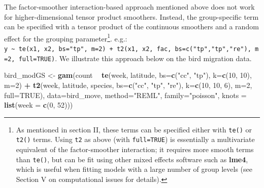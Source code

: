 \documentclass[12pt]{article}
\newenvironment{Shaded}{\begin{snugshade}}{\end{snugshade}}
\newcommand{\KeywordTok}[1]{\textcolor[rgb]{0.13,0.29,0.53}{\textbf{#1}}}
\newcommand{\DataTypeTok}[1]{\textcolor[rgb]{0.13,0.29,0.53}{#1}}
\newcommand{\DecValTok}[1]{\textcolor[rgb]{0.00,0.00,0.81}{#1}}
\newcommand{\StringTok}[1]{\textcolor[rgb]{0.31,0.60,0.02}{#1}}
\newcommand{\OtherTok}[1]{\textcolor[rgb]{0.56,0.35,0.01}{#1}}
\newcommand{\OperatorTok}[1]{\textcolor[rgb]{0.81,0.36,0.00}{\textbf{#1}}}
\newcommand{\NormalTok}[1]{#1}
\let\rmarkdownfootnote\footnote%
\def\footnote{\protect\rmarkdownfootnote}
\begin{document}
The factor-smoother interaction-based approach mentioned above does not
work for higher-dimensional tensor product smoothers. Instead, the
group-specific term can be specified with a tensor product of the
continuous smoothers and a random effect for the grouping
parameter\footnote{As mentioned in section II, these terms can be
  specified either with \texttt{te()} or \texttt{t2()} terms. Using
  \texttt{t2} as above (with \texttt{full=TRUE}) is essentially a
  multivariate equivalent of the factor-smoother interaction; it
  requires more smooth terms than \texttt{te()}, but can be fit using
  other mixed effects software such as \textbf{lme4}, which is useful
  when fitting models with a large number of group levels (see Section V
  on computational issues for details).}. e.g.:
\texttt{y\ \textasciitilde{}\ te(x1,\ x2,\ bs="tp",\ m=2)\ +\ t2(x1,\ x2,\ fac,\ bs=c("tp","tp","re"),\ m=2,\ full=TRUE)}.
We illustrate this approach below on the bird migration data.

\begin{Shaded}
\begin{Highlighting}[]
\NormalTok{bird_modGS <-}\StringTok{ }\KeywordTok{gam}\NormalTok{(count }\OperatorTok{~}\StringTok{ }\KeywordTok{te}\NormalTok{(week, latitude, }\DataTypeTok{bs=}\KeywordTok{c}\NormalTok{(}\StringTok{"cc"}\NormalTok{, }\StringTok{"tp"}\NormalTok{),}
                            \DataTypeTok{k=}\KeywordTok{c}\NormalTok{(}\DecValTok{10}\NormalTok{, }\DecValTok{10}\NormalTok{), }\DataTypeTok{m=}\DecValTok{2}\NormalTok{) }\OperatorTok{+}
\StringTok{                   }\KeywordTok{t2}\NormalTok{(week, latitude, species, }\DataTypeTok{bs=}\KeywordTok{c}\NormalTok{(}\StringTok{"cc"}\NormalTok{, }\StringTok{"tp"}\NormalTok{, }\StringTok{"re"}\NormalTok{),}
                      \DataTypeTok{k=}\KeywordTok{c}\NormalTok{(}\DecValTok{10}\NormalTok{, }\DecValTok{10}\NormalTok{, }\DecValTok{6}\NormalTok{), }\DataTypeTok{m=}\DecValTok{2}\NormalTok{, }\DataTypeTok{full=}\OtherTok{TRUE}\NormalTok{),}
                 \DataTypeTok{data=}\NormalTok{bird_move, }\DataTypeTok{method=}\StringTok{"REML"}\NormalTok{, }\DataTypeTok{family=}\StringTok{"poisson"}\NormalTok{, }
                 \DataTypeTok{knots =} \KeywordTok{list}\NormalTok{(}\DataTypeTok{week =} \KeywordTok{c}\NormalTok{(}\DecValTok{0}\NormalTok{, }\DecValTok{52}\NormalTok{)))}
\end{Highlighting}
\end{Shaded}
\end{document}
